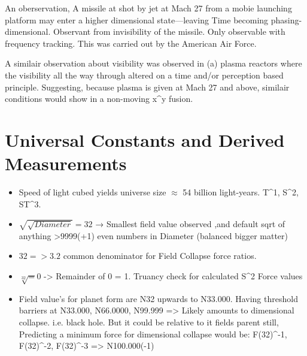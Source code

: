\documentclass[12pt]{thesis}
\begin{document}
An oberservation, A missile at shot by jet at Mach 27 from a mobie launching platform may enter a higher dimensional state—leaving Time becoming phasing-dimensional.
Observant from invisibility of the missile. Only observable with frequency tracking. This was carried out by the American Air Force.

A similair observation about visibility was observed in (a) plasma reactors where the visibility all the way through altered on a time and/or perception based principle.
Suggesting, because plasma is given at Mach 27 and above, similair conditions would show in a non-moving x^y fusion.

\section{Universal Constants and Derived Measurements}
\begin{itemize}
    \item Speed of light cubed yields universe size $\approx$ 54 billion light-years. T^1, S^2, ST^3.
    \item $\sqrt{\sqrt{Diameter}} = 32$ → Smallest field value observed ,and default sqrt of anything >9999(+1) even numbers in Diameter (balanced bigger matter) 
    \item {$32 => 3.2$} common denominator for Field Collapse force ratios.
    \item $\sqrt[32] = 0$ -> Remainder of 0 = 1. Truancy check for calculated S^2 Force values
    \item Field value's for planet form are N32 upwards to N33.000. Having threshold barriers at N33.000, N66.0000, N99.999 => Likely amounts to dimensional collapse. i.e. black hole. But it could be relative to it fields parent still, Predicting a minimum force for dimensional collapse would be:
    F(32)^-1, F(32)^-2, F(32)^-3 => N100.000(-1)

    
\end{itemize}
\end{document}
